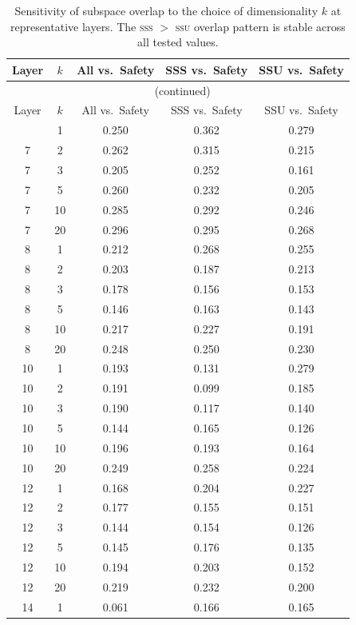 \documentclass{article}
\newcommand{\ssu}{\textsc{ssu}}
\newcommand{\sss}{\textsc{sss}}
\begin{document}
\begin{longtable}{c c ccc}
\caption{Sensitivity of subspace overlap to the choice of dimensionality $k$
         at representative layers.  The \sss{} $>$ \ssu{} overlap pattern is
         stable across all tested values.}
\label{tab:sensitivity_full}\\
\toprule
Layer & $k$ & All vs.\ Safety & SSS vs.\ Safety & SSU vs.\ Safety \\
\midrule
\endfirsthead
\multicolumn{5}{c}{\tablename\ \thetable{} (continued)} \\
\toprule
Layer & $k$ & All vs.\ Safety & SSS vs.\ Safety & SSU vs.\ Safety \\
\midrule
\endhead
\bottomrule
\endlastfoot
 7 &  1 & 0.250 & 0.362 & 0.279 \\
 7 &  2 & 0.262 & 0.315 & 0.215 \\
 7 &  3 & 0.205 & 0.252 & 0.161 \\
 7 &  5 & 0.260 & 0.232 & 0.205 \\
 7 & 10 & 0.285 & 0.292 & 0.246 \\
 7 & 20 & 0.296 & 0.295 & 0.268 \\
 8 &  1 & 0.212 & 0.268 & 0.255 \\
 8 &  2 & 0.203 & 0.187 & 0.213 \\
 8 &  3 & 0.178 & 0.156 & 0.153 \\
 8 &  5 & 0.146 & 0.163 & 0.143 \\
 8 & 10 & 0.217 & 0.227 & 0.191 \\
 8 & 20 & 0.248 & 0.250 & 0.230 \\
10 &  1 & 0.193 & 0.131 & 0.279 \\
10 &  2 & 0.191 & 0.099 & 0.185 \\
10 &  3 & 0.190 & 0.117 & 0.140 \\
10 &  5 & 0.144 & 0.165 & 0.126 \\
10 & 10 & 0.196 & 0.193 & 0.164 \\
10 & 20 & 0.249 & 0.258 & 0.224 \\
12 &  1 & 0.168 & 0.204 & 0.227 \\
12 &  2 & 0.177 & 0.155 & 0.151 \\
12 &  3 & 0.144 & 0.154 & 0.126 \\
12 &  5 & 0.145 & 0.176 & 0.135 \\
12 & 10 & 0.194 & 0.203 & 0.152 \\
12 & 20 & 0.219 & 0.232 & 0.200 \\
14 &  1 & 0.061 & 0.166 & 0.165 \\

\end{longtable}
\end{document}

